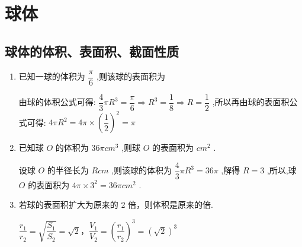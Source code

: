 \section*{球体}
\subsection*{球体的体积、表面积、截面性质}
\begin{enumerate}
    \item 已知一球的体积为 $\dfrac{\pi }{6}$ ,则该球的表面积为\blkda{$\pi$}
    \begin{jieda}
        由球的体积公式可得: $\dfrac{4}{3}\pi {R}^{3} = \dfrac{\pi }{6} \Rightarrow  {R}^{3} = \dfrac{1}{8} \Rightarrow  R = \dfrac{1}{2}$ ,所以再由球的表面积公式可得: ${4\pi }{R}^{2} = {4\pi } \times  {\left( \dfrac{1}{2}\right) }^{2} = \pi$
    \end{jieda}
    \item 已知球 $O$ 的体积为 ${36\pi }{{{cm}}}^{3}$ ,则球 $O$ 的表面积为\blkda{$36\pi$} ${{{cm}}}^{2}$ .
    \begin{jieda}
        设球 $O$ 的半径长为 $R{{cm}}$ ,则该球的体积为 $\dfrac{4}{3}\pi {R}^{3} = {36\pi }$ ,解得 $R = 3$ ,所以,球 $O$ 的表面积为 ${4\pi } \times  {3}^{2} = {36\pi }{{{cm}}}^{2}$ .
    \end{jieda}
    \item 若球的表面积扩大为原来的 2 倍，则体积是原来的倍.
    \begin{jieda}
        $\dfrac{r_1}{r_2} = \sqrt{\dfrac{S_1}{S_2}} = \sqrt{2}$，$\dfrac{V_1}{V_2} = \left(\dfrac{r_1}{r_2}\right)^3 = (\sqrt{2})^3$
    \end{jieda}


\end{enumerate}
